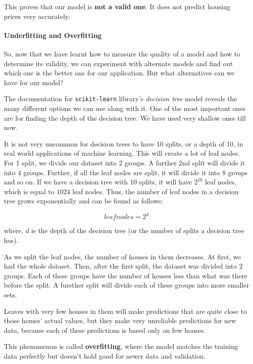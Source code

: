 \documentclass[11pt]{article}
\begin{document}
This proves that our model is \textbf{not a valid one}. It does not
predict housing prices very accurately.

    \hypertarget{underfitting-and-overfitting}{%
\paragraph{Underfitting and
Overfitting}\label{underfitting-and-overfitting}}

    So, now that we have learnt how to measure the quality of a model and
how to determine its validity, we can experiment with alternate models
and find out which one is the better one for our application. But what
alternatives can we have for our model?

The documentation for \texttt{scikit-learn} library's \emph{decision
tree} model reveals the many different options we can use along with it.
One of the most important ones are for finding the depth of the decision
tree. We have used very shallow ones till now.

It is not very uncommon for decision trees to have 10 splits, or a depth
of 10, in real world applications of machine learning. This will create
a lot of leaf nodes. For 1 split, we divide our dataset into \(2\)
groups. A further 2nd split will divide it into \(4\) groups. Further,
if all the leaf nodes are split, it will divide it into \(8\) groups and
so on. If we have a decision tree with 10 splits, it will have
\(2^{10}\) leaf nodes, which is equal to 1024 leaf nodes. Thus, the
number of leaf nodes in a decision tree grows exponentially and can be
found as follows:

\[
leaf nodes = 2^{d}
\]

where, \(d\) is the depth of the decision tree (or the number of splits
a decision tree has).

As we split the leaf nodes, the number of houses in them decreases. At
first, we had the whole dataset. Then, after the first split, the
dataset was divided into \(2\) groups. Each of these groups have the
number of houses less than what was there before the split. A fursther
split will divide each of these groups into more smaller sets.

Leaves with very few houses in them will make predictions that are quite
close to those homes' actual values, but they make very unreliable
predictions for new data, because each of these predictions is based
only on few houses.

This phenomenon is called \textbf{overfitting}, where the model matches
the training data perfectly but doesn't hold good for newer data and
validation.
\end{document}
